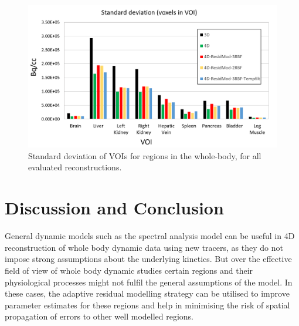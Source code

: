 \begin{figure} [h!]
\centering
\includegraphics[scale=0.45 ,angle=0]{3_Results/3_3_DWB_Reconstruction/MIC2020/BarPlot.png}
\caption{Standard deviation of VOIs for regions in the whole-body, for all evaluated reconstructions.} 
\label{fig:BarPlot}
\end{figure}


\section{Discussion and Conclusion}
General dynamic models such as the spectral analysis model can be useful in 4D reconstruction of whole body dynamic data using new tracers, as they do not impose strong assumptions about the underlying kinetics. But over the effective field of view of whole body dynamic studies certain regions and their physiological processes might not fulfil the general assumptions of the model. In these cases, the adaptive residual modelling strategy can be utilised to improve parameter estimates for these regions and help in minimising the risk of spatial propagation of errors to other well modelled regions.


